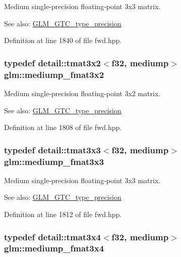 Medium single-precision floating-point 3x3 matrix. \begin{Desc}
\item[See also:]\hyperlink{group__gtc__type__precision}{GLM\_\-GTC\_\-type\_\-precision} \end{Desc}


Definition at line 1840 of file fwd.hpp.\hypertarget{group__gtc__type__precision_g40681f25413b8705b16da2f534692f59}{
\subsubsection[mediump\_\-fmat3x2]{\setlength{\rightskip}{0pt plus 5cm}typedef detail::tmat3x2$<$f32, mediump$>$ {\bf glm::mediump\_\-fmat3x2}}}
\label{group__gtc__type__precision_g40681f25413b8705b16da2f534692f59}


Medium single-precision floating-point 3x2 matrix. \begin{Desc}
\item[See also:]\hyperlink{group__gtc__type__precision}{GLM\_\-GTC\_\-type\_\-precision} \end{Desc}


Definition at line 1808 of file fwd.hpp.\hypertarget{group__gtc__type__precision_ga7f015dd5b962a658178bb881d4620cc}{
\subsubsection[mediump\_\-fmat3x3]{\setlength{\rightskip}{0pt plus 5cm}typedef detail::tmat3x3$<$f32, mediump$>$ {\bf glm::mediump\_\-fmat3x3}}}
\label{group__gtc__type__precision_ga7f015dd5b962a658178bb881d4620cc}


Medium single-precision floating-point 3x3 matrix. \begin{Desc}
\item[See also:]\hyperlink{group__gtc__type__precision}{GLM\_\-GTC\_\-type\_\-precision} \end{Desc}


Definition at line 1812 of file fwd.hpp.\hypertarget{group__gtc__type__precision_gfa5aaa948365f349840dfeb9eeebf0cd}{
\subsubsection[mediump\_\-fmat3x4]{\setlength{\rightskip}{0pt plus 5cm}typedef detail::tmat3x4$<$f32, mediump$>$ {\bf glm::mediump\_\-fmat3x4}}}
\label{group__gtc__type__precision_gfa5aaa948365f349840dfeb9eeebf0cd}


